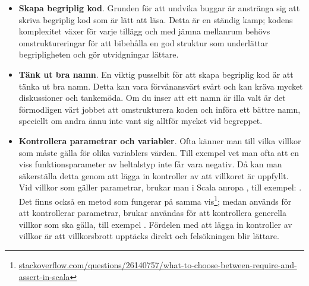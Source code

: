 \begin{itemize}
\item \textbf{Skapa begriplig kod}. Grunden för att undvika buggar är anstränga sig att skriva begriplig kod som är lätt att läsa. Detta är en ständig kamp; kodens komplexitet växer för varje tillägg och med jämna mellanrum behövs omstruktureringar  för att bibehålla en god struktur som underlättar begripligheten och gör utvidgningar lättare. 

\item \textbf{Tänk ut bra namn}. En viktig pusselbit för att skapa begriplig kod är att tänka ut bra namn. Detta kan vara förvånansvärt svårt och kan kräva mycket diskussioner och tankemöda. 
Om du inser att ett namn är illa valt är det förmodligen värt jobbet att omstrukturera koden och införa ett bättre namn, speciellt om andra ännu inte vant sig alltför mycket vid begreppet. 

\item \textbf{Kontrollera parametrar och variabler}. Ofta känner man till vilka villkor som måste gälla för olika variablers värden. Till exempel vet man ofta att en viss funktionsparameter av heltalstyp inte får vara negativ. Då kan man säkerställa detta genom att lägga in kontroller av att villkoret är uppfyllt. Vid villkor som gäller parametrar, brukar man i Scala anropa , till exempel: . Det finns också en metod  som fungerar på samma vis\footnote{\href{http://stackoverflow.com/questions/26140757/what-to-choose-between-require-and-assert-in-scala}{stackoverflow.com/questions/26140757/what-to-choose-between-require-and-assert-in-scala}}; medan  används för att kontrollerar parametrar, brukar  användas för att kontrollera generella villkor som ska gälla, till exempel .  Fördelen med att lägga in kontroller av villkor är att villkorsbrott upptäcks direkt och felsökningen blir lättare. 


\end{itemize}
